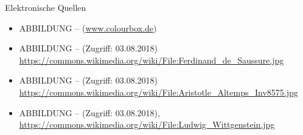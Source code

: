 
\begin{frame}[allowframebreaks]{Elektronische Quellen}
\small

\begin{itemize}
	\item ABBILDUNG --  (\url{www.colourbox.de})
	\item ABBILDUNG --  (Zugriff: 03.08.2018) \url{https://commons.wikimedia.org/wiki/File:Ferdinand_de_Saussure.jpg}
	\item ABBILDUNG --  (Zugriff: 03.08.2018) \url{https://commons.wikimedia.org/wiki/File:Aristotle_Altemps_Inv8575.jpg}
	\item ABBILDUNG --  (Zugriff: 03.08.2018), \url{https://commons.wikimedia.org/wiki/File:Ludwig_Wittgenstein.jpg}
\end{itemize}

\end{frame}

